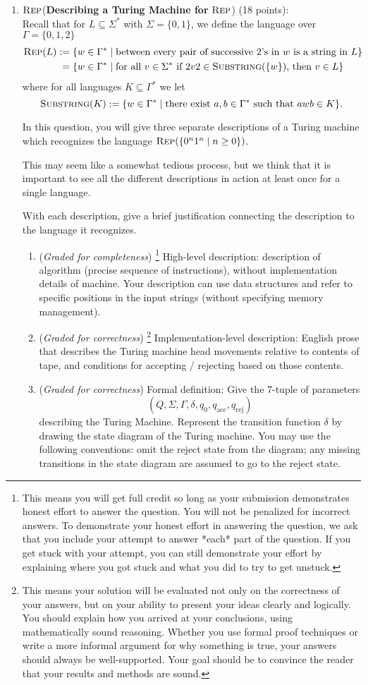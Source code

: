 \documentclass[12pt, oneside]{article}
\newcommand{\gradeCorrect}{({\it Graded for correctness}) }
\newcommand{\gradeCorrectFirst}{\gradeCorrect\footnote{This means your solution 
will be evaluated not only on the correctness of your answers, but on your ability
to present your ideas clearly and logically. You should explain how you 
arrived at your conclusions, using
mathematically sound reasoning. Whether you use formal proof techniques or 
write a more informal argument
for why something is true, your answers should always be well-supported. 
Your goal should be to convince the
reader that your results and methods are sound.} }
\newcommand{\gradeComplete}{({\it Graded for completeness}) }
\newcommand{\gradeCompleteFirst}{\gradeComplete\footnote{This means you will 
get full credit so long as your submission demonstrates honest effort to 
answer the question. You will not be penalized for incorrect answers. 
To demonstrate your honest effort in answering the question, we ask 
that you include your attempt to answer *each* part of the question. 
If you get stuck with your attempt, you can still demonstrate 
your effort by explaining where you got stuck and what 
you did to try to get unstuck.} }
\newcommand{\SUBSTRING}{\textsc{Substring}}
\newcommand{\REP}{\textsc{Rep}}
\begin{document}
\begin{enumerate} 


\item $\REP$(\textbf{Describing a Turing Machine for }$\REP$) 
(18 points): \\
Recall that for $L \subseteq \Sigma^*$ with $\Sigma = \{0,1\}$, 
we define the language over $\Gamma = \{0,1,2\}$
\begin{align*}
\REP(L) &:= \{ w \in \Gamma^* \mid \text{between every pair of successive $2$'s in $w$ is a string in $L$}\}\\
&\phantom{:}=\{w \in \Gamma^* \mid \text{for all } v \in \Sigma^* \text{ if } 2v2 \in \SUBSTRING(\{w\})  
\text{, then } v \in L\} 
\end{align*}
where for all languages $K \subseteq \Gamma^*$ we let
\[
\SUBSTRING(K) := \{ w \in \Gamma^* \mid \text{there exist } a,b \in \Gamma^* \text{ such that } awb \in K\}.
\]

In this question, you will give three separate descriptions of a Turing machine 
which recognizes the language $\REP(\{0^n1^n \mid n \ge 0\})$. 

This may seem like a somewhat tedious process, but we think that it is important 
to see all the different descriptions in action at least once for a single language.

With each description, give a brief justification connecting the description to the language it recognizes.

\begin{enumerate}
\item\gradeCompleteFirst High-level description: 
description of algorithm (precise sequence of instructions), 
without implementation details of machine. Your description 
can use data structures and refer to specific positions 
in the input strings (without specifying memory management).

\item\gradeCorrectFirst Implementation-level description: English prose that 
describes the Turing machine head movements relative to contents of tape, 
and conditions for accepting / rejecting based on those contents.

\item\gradeCorrect Formal definition: Give the 7-tuple of parameters 
$$(Q, \Sigma, \Gamma, \delta, q_0, q_{\mathrm{acc}}, q_{\mathrm{rej}})$$ 
describing the Turing Machine. Represent the transition 
function $\delta$ by drawing the
state diagram of the Turing machine. You may use the following 
conventions: omit the reject state from the diagram; any missing 
transitions in the state diagram are assumed to go to the reject state.


\end{enumerate}
\end{enumerate}
\end{document}
